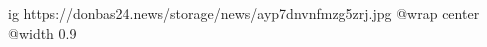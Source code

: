  
 
 
 
 

\ifcmt
  ig https://donbas24.news/storage/news/ayp7dnvnfmzg5zrj.jpg
  @wrap center
  @width 0.9
\fi
